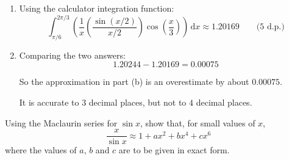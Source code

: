 \documentclass[leqno]{article}
\begin{document}
\begin{enumerate}[
  label=\textbf{\arabic*.},
  leftmargin=*,
  topsep=0pt,
  partopsep=0pt,
  parsep=0pt
]
\begin{djsSolution}
\begin{enumerate}[label=\textbf{(\alph*)}]
Now simplify:
\begin{align*}
\ln\left(\frac{2\pi}{3}\right)-\ln\left(\frac{\pi}{6}\right)
&=\ln\left(\frac{2\pi/3}{\pi/6}\right) \\
&=\ln 4
\end{align*}
\begin{align*}
-\frac{7}{144}\left[\left(\frac{2\pi}{3}\right)^2-\left(\frac{\pi}{6}\right)^2\right]
&=-\frac{7}{144}\left(\frac{4\pi^2}{9}-\frac{\pi^2}{36}\right) \\
&=-\frac{7}{144}\times\frac{15\pi^2}{36} \\
&=-\frac{35\pi^2}{1728}
\end{align*}
\begin{align*}
\frac{521}{622080}\left[\left(\frac{2\pi}{3}\right)^4-\left(\frac{\pi}{6}\right)^4\right]
&=\frac{521}{622080}\left(\frac{16\pi^4}{81}-\frac{\pi^4}{1296}\right) \\
&=\frac{521}{622080}\times\frac{255\pi^4}{1296} \\
&=\frac{8857\pi^4}{53747712}
\end{align*}

So
\[
I\approx \ln 4-\frac{35\pi^2}{1728}+\frac{8857\pi^4}{53747712}
\]

Hence
\[
I\approx 1.20244\qquad\text{(5 d.p.)}
\]

  \item Using the calculator integration function:
\[
\int_{\pi/6}^{2\pi/3}\left(\frac{1}{x}\left(\frac{\sin(x/2)}{x/2}\right)\cos\left(\frac{x}{3}\right)\right)\,\mathrm{d}x \approx 1.20169\qquad\text{(5 d.p.)}
\]

  \item Comparing the two answers:
\[
1.20244-1.20169=0.00075
\]

So the approximation in part (b) is an overestimate by about \(0.00075\).

It is accurate to \(3\) decimal places, but not to \(4\) decimal places.
\end{enumerate}
\end{djsSolution}


\newpage

\questionitem

Using the Maclaurin series for $\sin x$, show that, for small values of $x$,
\[
\frac{x}{\sin x} \approx 1 + ax^2 + bx^4 + cx^6
\]
where the values of $a$, $b$ and $c$ are to be given in exact form. 

\vspace*{10pt}


\end{enumerate}
\end{document}

